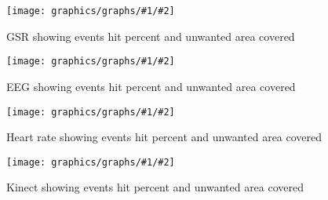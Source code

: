 \newcommand{\fuckinggraph}[4]{
    \begin{figure}[h!]
    \begin{minipage}[t]{0.5\textwidth}
        \texttt{[image: graphics/graphs/\#1/\#2]}
        \caption{#3}
        \label{#4}
    \end{minipage}
    \end{figure}
}

\newcommand{\fuckinggraphevenidontwanttorepeatmyself}[4]{ %
  \fuckinggraph{#1}
  {False_cover_rate_(FCR)-Events_hit_rate_(EHR)-CovNu-#2.pdf}{#3}{#4}
}

\fuckinggraphevenidontwanttorepeatmyself{short}{GSR}
{GSR showing events hit percent and unwanted area covered}{fig:gsr_event_ehr}

\fuckinggraphevenidontwanttorepeatmyself{short}{EEG}
{EEG showing events hit percent and unwanted area covered}{fig:eeg_event_ehr}

\fuckinggraphevenidontwanttorepeatmyself{short}{HR}
{Heart rate showing events hit percent and unwanted area covered}{fig:hr_event_ehr}

\fuckinggraphevenidontwanttorepeatmyself{short}{FACE}
{Kinect showing events hit percent and unwanted area covered}{fig:face_event_ehr}
